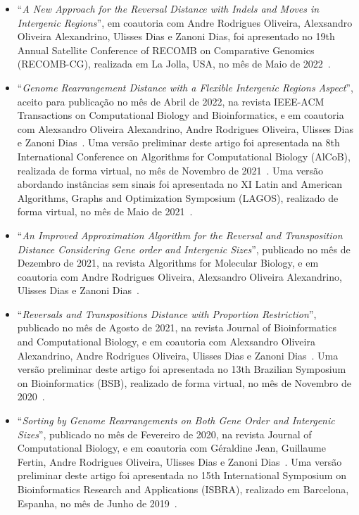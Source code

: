 \begin{itemize}
  \item ``\textit{A New Approach for the Reversal Distance with Indels and Moves in Intergenic Regions}'', em coautoria com Andre Rodrigues Oliveira, Alexsandro Oliveira Alexandrino, Ulisses Dias e Zanoni Dias, foi apresentado no 19th Annual Satellite Conference of RECOMB on Comparative Genomics (RECOMB-CG), realizada em La Jolla, USA, no mês de Maio de 2022~\cite{2022b-brito-etal}.

  \item ``\textit{Genome Rearrangement Distance with a Flexible Intergenic Regions Aspect}'', aceito para publicação no mês de Abril de 2022, na revista IEEE-ACM Transactions on Computational Biology and Bioinformatics, e em coautoria com Alexsandro Oliveira Alexandrino, Andre Rodrigues Oliveira, Ulisses Dias e Zanoni Dias~\cite{2022a-brito-etal}. Uma versão preliminar deste artigo foi apresentada na 8th International Conference on Algorithms for Computational Biology (AlCoB), realizada de forma virtual, no mês de Novembro de 2021~\cite{2021c-brito-etal}. Uma versão abordando instâncias sem sinais foi apresentada no XI Latin and American Algorithms, Graphs and Optimization Symposium (LAGOS), realizado de forma virtual, no mês de Maio de 2021~\cite{2021d-brito-etal}.

  \item ``\textit{An Improved Approximation Algorithm for the Reversal and Transposition Distance Considering Gene order and Intergenic Sizes}'', publicado no mês de Dezembro de 2021, na revista Algorithms for Molecular Biology, e em coautoria com Andre Rodrigues Oliveira, Alexsandro Oliveira Alexandrino, Ulisses Dias e Zanoni Dias~\cite{2021b-brito-etal}.

  \item ``\textit{Reversals and Transpositions Distance with Proportion Restriction}'', publicado no mês de Agosto de 2021, na revista Journal of Bioinformatics and Computational Biology, e em coautoria com Alexsandro Oliveira Alexandrino, Andre Rodrigues Oliveira, Ulisses Dias e Zanoni Dias~\cite{2021a-brito-etal}. Uma versão preliminar deste artigo foi apresentada no 13th Brazilian Symposium on Bioinformatics (BSB), realizado de forma virtual, no mês de Novembro de 2020~\cite{2020c-brito-etal}.

  \item ``\textit{Sorting by Genome Rearrangements on Both Gene Order and Intergenic Sizes}'', publicado no mês de Fevereiro de 2020, na revista Journal of Computational Biology, e em coautoria com Géraldine Jean, Guillaume Fertin, Andre Rodrigues Oliveira, Ulisses Dias e Zanoni Dias~\cite{2020a-brito-etal}. Uma versão preliminar deste artigo foi apresentada no 15th International Symposium on Bioinformatics Research and Applications (ISBRA), realizado em Barcelona, Espanha, no mês de Junho de 2019~\cite{2019-brito-etal}.
\end{itemize}

